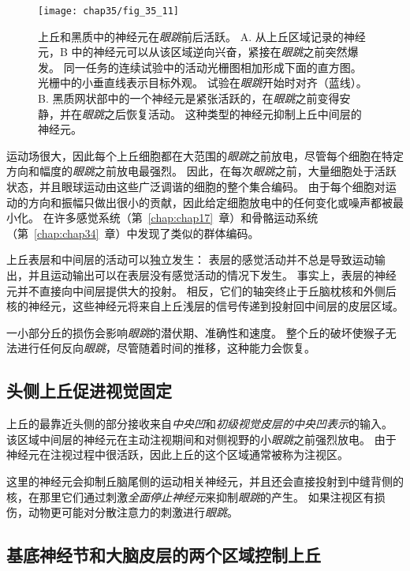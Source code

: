 \begin{figure}[htbp]
	\centering
	\texttt{[image: chap35/fig\_35\_11]}
	\caption{上丘和黑质中的神经元在\textit{眼跳}前后活跃\cite{hikosaka1989functional}。
		A. 从上丘区域记录的神经元，B 中的神经元可以从该区域逆向兴奋，紧接在\textit{眼跳}之前突然爆发。
		同一任务的连续试验中的活动光栅图相加形成下面的直方图。
		光栅中的小垂直线表示目标外观。
		试验在\textit{眼跳}开始时对齐（蓝线）。
		B. 黑质网状部中的一个神经元是紧张活跃的，在\textit{眼跳}之前变得安静，并在\textit{眼跳}之后恢复活动。
		这种类型的神经元抑制上丘中间层的神经元。}
	\label{fig:35_11}
\end{figure}


运动场很大，因此每个上丘细胞都在大范围的\textit{眼跳}之前放电，尽管每个细胞在特定方向和幅度的\textit{眼跳}之前放电最强烈。
因此，在每次\textit{眼跳}之前，大量细胞处于活跃状态，并且眼球运动由这些广泛调谐的细胞的整个集合编码。
由于每个细胞对运动的方向和振幅只做出很小的贡献，因此给定细胞放电中的任何变化或噪声都被最小化。
在许多感觉系统（第~\ref{chap:chap17}~章）和骨骼运动系统（第~\ref{chap:chap34}~章）中发现了类似的群体编码。


上丘表层和中间层的活动可以独立发生：
表层的感觉活动并不总是导致运动输出，并且运动输出可以在表层没有感觉活动的情况下发生。
事实上，表层的神经元并不直接向中间层提供大的投射。
相反，它们的轴突终止于丘脑枕核和外侧后核的神经元，这些神经元将来自上丘浅层的信号传递到投射回中间层的皮层区域。


一小部分丘的损伤会影响\textit{眼跳}的潜伏期、准确性和速度。
整个丘的破坏使猴子无法进行任何反向\textit{眼跳}，尽管随着时间的推移，这种能力会恢复。



\subsection{头侧上丘促进视觉固定}

上丘的最靠近头侧的部分接收来自\textit{中央凹}和\textit{初级视觉皮层的中央凹表示}的输入。
该区域中间层的神经元在主动注视期间和对侧视野的小\textit{眼跳}之前强烈放电。
由于神经元在注视过程中很活跃，因此上丘的这个区域通常被称为注视区。


这里的神经元会抑制丘脑尾侧的运动相关神经元，并且还会直接投射到中缝背侧的核，在那里它们通过刺激\textit{全面停止神经元}来抑制\textit{眼跳}的产生。
如果注视区有损伤，动物更可能对分散注意力的刺激进行\textit{眼跳}。


\subsection{基底神经节和大脑皮层的两个区域控制上丘}

